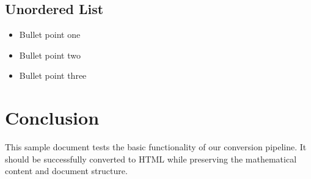 \documentclass{article}
\begin{document}
\subsection{Unordered List}
\begin{itemize}
\item Bullet point one
\item Bullet point two
\item Bullet point three
\end{itemize}

\section{Conclusion}

This sample document tests the basic functionality of our conversion pipeline. It should be successfully converted to HTML while preserving the mathematical content and document structure.
\end{document}
